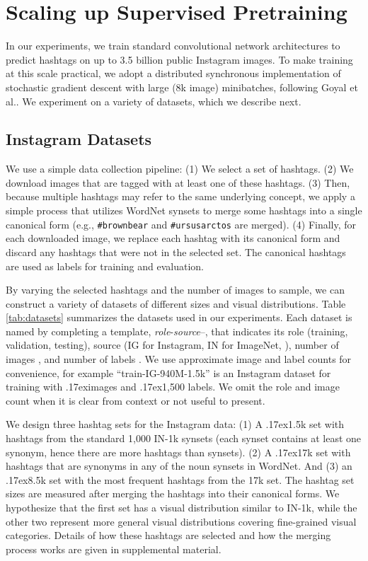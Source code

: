 \documentclass[runningheads]{llncs}
\makeatletter
\newcommand*{\etc}{\@ifnextchar{.}{etc}{etc.\@\xspace}}
\newcommand{\etal}{et al.\@\xspace}
\newcommand{\eg}{e.g.\@\xspace}
\newcommand{\app}{\raise.17ex\hbox{}}
\makeatother
\begin{document}
 \section{Scaling up Supervised Pretraining}
\label{sec:methods}

In our experiments, we train standard convolutional network architectures to predict hashtags on up to 3.5 billion public Instagram images. To make training at this scale practical, we adopt a distributed synchronous implementation of stochastic gradient descent with large (8k image) minibatches, following Goyal \etal \cite{goyal2017accurate}. We experiment on a variety of datasets, which we describe next.

\subsection{Instagram Datasets}
\label{sec:ig_datasets}

We use a simple data collection pipeline: (1) We select a set of hashtags. (2) We download images that are tagged with at least one of these hashtags. (3) Then, because multiple hashtags may refer to the same underlying concept, we apply a simple process that utilizes WordNet \cite{wordnet} synsets to merge some hashtags into a single canonical form (\eg, \texttt{\#brownbear} and \texttt{\#ursusarctos} are merged). (4) Finally, for each downloaded image, we replace each hashtag with its canonical form and discard any hashtags that were not in the selected set. The canonical hashtags are used as labels for training and evaluation.

By varying the selected hashtags and the number of images to sample, we can construct a variety of datasets of different sizes and visual distributions. Table \ref{tab:datasets} summarizes the datasets used in our experiments. Each dataset is named by completing a template, \emph{role}-\emph{source}--, that indicates its role (training, validation, testing), source (IG for Instagram, IN for ImageNet, \etc), number of images , and number of labels . We use approximate image and label counts for convenience, for example ``train-IG-940M-1.5k'' is an Instagram dataset for training with \app  images and \app 1,500 labels. We omit the role and image count when it is clear from context or not useful to present.

We design three hashtag sets for the Instagram data: (1) A \app 1.5k set with hashtags from the standard 1,000 IN-1k synsets (each synset contains at least one synonym, hence there are more hashtags than synsets). (2) A \app 17k set with hashtags that are synonyms in any of the noun synsets in WordNet. And (3) an \app 8.5k set with the most frequent hashtags from the 17k set. The hashtag set sizes are measured after merging the hashtags into their canonical forms. We hypothesize that the first set has a visual distribution similar to IN-1k, while the other two represent more general visual distributions covering fine-grained visual categories. Details of how these hashtags are selected and how the merging process works are given in supplemental material.
\end{document}
